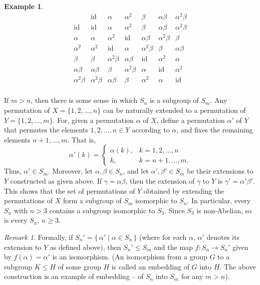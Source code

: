 \documentclass[svgnames]{article}
\theoremstyle{definition}
\newtheorem{Example}[Example]{Example}
\theoremstyle{remark}
\newtheorem*{Remark*}{Remark}
\newcommand{\id}{\mathrm{id}}
\newcommand{\newterm}[1]{{\color{alertcolor} #1}}
\begin{document}
\begin{appendices}
\begin{Example}
\begin{equation*}
\begin{array}{r|cccccc}
			&	\id			&	\alpha			&	\alpha^2	&	\beta	&	\alpha\beta		&	\alpha^2\beta	\\
\hline
	\id		&	\id			&	\alpha			&	\alpha^2	&	\beta	&	\alpha\beta		&	\alpha^2\beta	\\
	\alpha	&	\alpha		&	\alpha^2		&	\id		&	\alpha\beta	&	\alpha^2\beta	&	\beta	\\
	\alpha^2&	\alpha^2	&	\id				&	\alpha		&	\alpha^2\beta	&	\beta	&	\alpha\beta	\\
	\beta	&	\beta		&	\alpha^2\beta	&	\alpha\beta	&	\id		&	\alpha^2		&	\alpha	\\
\alpha\beta	&	\alpha\beta	&	\beta			&	\alpha^2\beta& \alpha	&	\id		&	\alpha^2 \\	
\alpha^2\beta&	\alpha^2\beta	&	\alpha\beta	&	\beta		&	\alpha^2	&	\alpha	&	\id \\
\end{array}
\end{equation*}
\end{Example}

If $m > n$, then there is some sense in which $S_n$ is a subgroup of $S_m$. Any permutation of $X = \{1, 2, \ldots, n\}$ can be naturally extended to a permutation of $Y = \{1, 2, \ldots, m\}$. For, given a permutation $\alpha$ of $X$, define a permutation $\alpha'$ of $Y$ that permutes the elements $1, 2, \ldots, n \in Y$ according to $\alpha$, and fixes the remaining elements $n + 1, \ldots, m$. That is,
\begin{equation*}
\alpha'(k) = \begin{cases}
\alpha(k), & k = 1, 2, \ldots, n\\
k,	&	k = n + 1, \ldots, m.
\end{cases}
\end{equation*}
Thus, $\alpha' \in S_m$. Moreover, let $\alpha, \beta \in S_n$, and let $\alpha', \beta'\in S_m$ be their extensions to $Y$ constructed as given above. If $\gamma = \alpha\beta$, then the extension of $\gamma$ to $Y$ is $\gamma' = \alpha'\beta'$. This shows that the set of permutations of $Y$ obtained by extending the permutations of $X$ form a subgroup of $S_m$ isomorphic to $S_n$. In particular, every $S_n$ with $n > 3$ contains a subgroup isomorphic to $S_3$. Since $S_3$ is non-Abelian, so is every $S_n$, $n \ge 3$.

\begin{Remark*}
Formally, if $S_n' = \{\, \alpha' \mid \alpha \in S_n \,\}$ (where for each $\alpha$, $\alpha'$ denotes its extension to $Y$ as defined above), then $S_n' \le S_m$ and the map $f \colon S_n \to S_n'$ given by $f(\alpha) = \alpha'$ is an isomorphism. {\small (An isomorphism from a group $G$ to a subgroup $K \le H$ of some group $H$ is called an \newterm{embedding} of $G$ into $H$. The above construction is an example of embedding -- of $S_n$ into $S_m$ for any $m > n$)}.
\end{Remark*}


\end{appendices}
\end{document}
